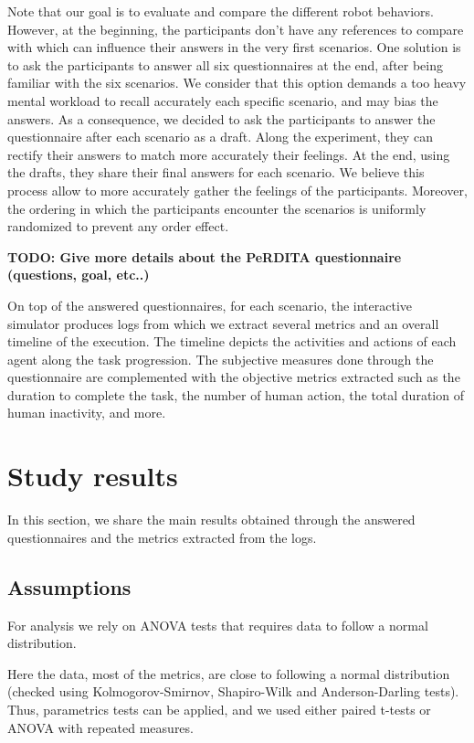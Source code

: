Note that our goal is to evaluate and compare the different robot behaviors. However, at the beginning, the participants don't have any references to compare with which can influence their answers in the very first scenarios. One solution is to ask the participants to answer all six questionnaires at the end, after being familiar with the six scenarios. We consider that this option demands a too heavy mental workload to recall accurately each specific scenario, and may bias the answers. As a consequence, we decided to ask the participants to answer the questionnaire after each scenario as a draft. Along the experiment, they can rectify their answers to match more accurately their feelings. At the end, using the drafts, they share their final answers for each scenario. We believe this process allow to more accurately gather the feelings of the participants. Moreover, the ordering in which the participants encounter the scenarios is uniformly randomized to prevent any order effect. 

\textbf{TODO: Give more details about the PeRDITA questionnaire (questions, goal, etc..)}

On top of the answered questionnaires, for each scenario, the interactive simulator produces logs from which we extract several metrics and an overall timeline of the execution. The timeline depicts the activities and actions of each agent along the task progression. The subjective measures done through the questionnaire are complemented with the objective metrics extracted such as the duration to complete the task, the number of human action, the total duration of human inactivity, and more. 



\section{Study results}

In this section, we share the main results obtained through the answered questionnaires and the metrics extracted from the logs.

\subsection{Assumptions}

For analysis we rely on ANOVA tests that requires data to follow a normal distribution. 

Here the data, most of the metrics, are close to following a normal distribution (checked using Kolmogorov-Smirnov, Shapiro-Wilk and Anderson-Darling tests). Thus, parametrics tests can be applied, and we used either paired t-tests or ANOVA with repeated measures.

